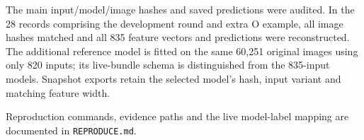 \documentclass{article}
\begin{document}
The main input/model/image hashes and saved predictions were audited. In the 28 records comprising the development round and extra O example, all image hashes matched and all 835 feature vectors and predictions were reconstructed. The additional reference model is fitted on the same 60,251 original images using only 820 inputs; its live-bundle schema is distinguished from the 835-input models. Snapshot exports retain the selected model's hash, input variant and matching feature width.

Reproduction commands, evidence paths and the live model-label mapping are documented in \texttt{REPRODUCE.md}.
\clearpage

\clearpage

\end{document}
